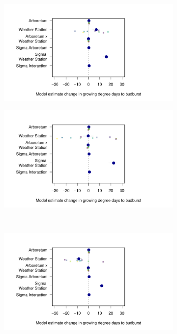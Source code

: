 \documentclass{article}\usepackage[]{graphicx}\usepackage[]{color}
\begin{document}
\begin{figure}
  \begin{subfigure}{.32\textwidth}
    \caption{}
    \centering
    \includegraphics[width=\linewidth]{..//analyses/figures/muplot_noisyws.pdf}
    \label{fig:muplotnoisyws}
  \end{subfigure}%
    \begin{subfigure}{.32\textwidth}
      \caption{}
      \centering
      \includegraphics[width=\linewidth]{..//analyses/figures/muplot_noisyhobo.pdf}
    \label{fig:muplotnoisyhobo}
  \end{subfigure}\\[1ex]
  \begin{subfigure}{.32\textwidth}
	    \caption{}
      \centering
      \includegraphics[width=\linewidth]{..//analyses/figures/muplot_micros.pdf}

\end{subfigure}
\end{figure}
\end{document}
